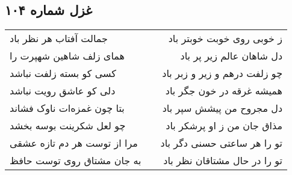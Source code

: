 \begin{center}
\section*{غزل شماره ۱۰۴}
\label{sec:sh104}
\begin{longtable}{l p{0.5cm} r}
جمالت آفتاب هر نظر باد
&&
ز خوبی روی خوبت خوبتر باد
\\
همای زلف شاهین شهپرت را
&&
دل شاهان عالم زیر پر باد
\\
کسی کو بسته زلفت نباشد
&&
چو زلفت درهم و زیر و زبر باد
\\
دلی کو عاشق رویت نباشد
&&
همیشه غرقه در خون جگر باد
\\
بتا چون غمزه‌ات ناوک فشاند
&&
دل مجروح من پیشش سپر باد
\\
چو لعل شکرینت بوسه بخشد
&&
مذاق جان من ز او پرشکر باد
\\
مرا از توست هر دم تازه عشقی
&&
تو را هر ساعتی حسنی دگر باد
\\
به جان مشتاق روی توست حافظ
&&
تو را در حال مشتاقان نظر باد
\\
\end{longtable}
\end{center}
